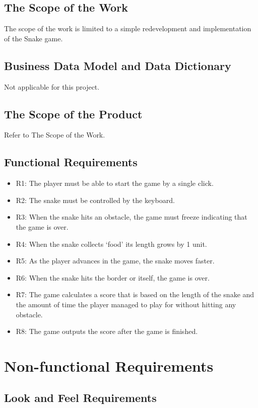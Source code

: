 \documentclass[12pt]{article}
\begin{document}
\subsection{The Scope of the Work}
The scope of the work is limited to a simple redevelopment and implementation of the Snake game.

\subsection{Business Data Model and Data Dictionary}
Not applicable for this project.

\subsection{The Scope of the Product}
Refer to The Scope of the Work.

\subsection{Functional Requirements}
\begin{itemize}
\item R1: The player must be able to start the game by a single click.
\item R2: The snake must be controlled by the keyboard.
\item R3: When the snake hits an obstacle, the game must freeze indicating that the game is over.
\item R4: When the snake collects ‘food’ its length grows by 1 unit.
\item R5: As the player advances in the game, the snake moves faster.
\item R6: When the snake hits the border or itself, the game is over.
\item R7: The game calculates a score that is based on the length of the snake and the amount of time the player managed to play for without hitting any obstacle.
\item R8: The game outputs the score after the game is finished.
\end{itemize}

\section{Non-functional Requirements} 
\subsection{Look and Feel Requirements}
\end{document}
